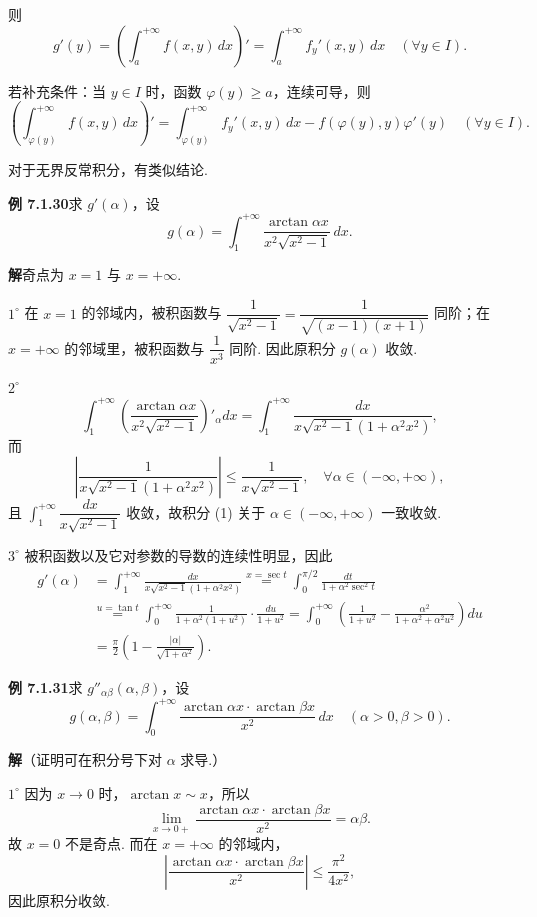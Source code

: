\documentclass[UTF8, 12pt, fontset=fandol, oneside]{ctexart}
\begin{document}
则
\[
g'(y)=\left(\int_a^{+\infty}f(x,y)\,dx\right)'
=\int_a^{+\infty}f_y'(x,y)\,dx\quad(\forall y\in I).
\]

若补充条件：当 $y\in I$ 时，函数 $\varphi(y)\ge a$，连续可导，则
\[
\left(\int_{\varphi(y)}^{+\infty}f(x,y)\,dx\right)'
=\int_{\varphi(y)}^{+\infty}f_y'(x,y)\,dx-f(\varphi(y),y)\varphi'(y)\quad(\forall y\in I).
\]

对于无界反常积分，有类似结论.

\noindent\textbf{例 7.1.30}\quad 求 $g'(\alpha)$，设
\[
g(\alpha)=\int_1^{+\infty}\frac{\arctan\alpha x}{x^2\sqrt{x^2-1}}\,dx.
\]

\noindent\textbf{解}\quad 奇点为 $x=1$ 与 $x=+\infty$.

$1^\circ$ 在 $x=1$ 的邻域内，被积函数与 $\dfrac1{\sqrt{x^2-1}}=\dfrac1{\sqrt{(x-1)(x+1)}}$ 同阶；在 $x=+\infty$ 的邻域里，被积函数与 $\dfrac1{x^3}$ 同阶. 因此原积分 $g(\alpha)$ 收敛.

$2^\circ$
\[
\int_1^{+\infty}\left(\frac{\arctan\alpha x}{x^2\sqrt{x^2-1}}\right)'_\alpha dx
=\int_1^{+\infty}\frac{dx}{x\sqrt{x^2-1}(1+\alpha^2x^2)},
\tag{1}
\]
而
\[
\left|\frac1{x\sqrt{x^2-1}(1+\alpha^2x^2)}\right|
\le\frac1{x\sqrt{x^2-1}},\quad \forall\alpha\in(-\infty,+\infty),
\]
且 $\displaystyle\int_1^{+\infty}\dfrac{dx}{x\sqrt{x^2-1}}$ 收敛，故积分 (1) 关于 $\alpha\in(-\infty,+\infty)$ 一致收敛.

$3^\circ$ 被积函数以及它对参数的导数的连续性明显，因此
\[
\begin{aligned}
g'(\alpha)
&=\int_1^{+\infty}\frac{dx}{x\sqrt{x^2-1}(1+\alpha^2x^2)}
\overset{x=\sec t}{=}\int_0^{\pi/2}\frac{dt}{1+\alpha^2\sec^2 t}\\
&\overset{u=\tan t}{=}\int_0^{+\infty}\frac1{1+\alpha^2(1+u^2)}\cdot\frac{du}{1+u^2}
=\int_0^{+\infty}\left(\frac1{1+u^2}-\frac{\alpha^2}{1+\alpha^2+\alpha^2u^2}\right)du\\
&=\frac{\pi}{2}\left(1-\frac{|\alpha|}{\sqrt{1+\alpha^2}}\right).
\end{aligned}
\]

\noindent\textbf{例 7.1.31}\quad 求 $g''_{\alpha\beta}(\alpha,\beta)$，设
\[
g(\alpha,\beta)=\int_0^{+\infty}\frac{\arctan\alpha x\cdot\arctan\beta x}{x^2}\,dx\quad(\alpha>0,\beta>0).
\]

\noindent\textbf{解}\quad （证明可在积分号下对 $\alpha$ 求导.）

$1^\circ$ 因为 $x\to0$ 时，$\arctan x\sim x$，所以
\[
\lim_{x\to0+}\frac{\arctan\alpha x\cdot\arctan\beta x}{x^2}=\alpha\beta.
\tag{1}
\]
故 $x=0$ 不是奇点. 而在 $x=+\infty$ 的邻域内，
\[
\left|\frac{\arctan\alpha x\cdot\arctan\beta x}{x^2}\right|\le\frac{\pi^2}{4x^2},
\]
因此原积分收敛.
\end{document}
